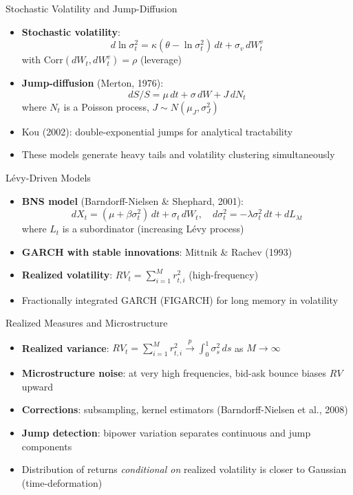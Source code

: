 \documentclass[9pt, aspectratio=169, t]{beamer}
\theoremstyle{definition}
\newcommand{\Corr}{\text{Corr}}
\begin{document}
\begin{frame}{Stochastic Volatility and Jump-Diffusion}
\begin{itemize}
\item \textbf{Stochastic volatility}:
\[
d\ln\sigma_t^2 = \kappa(\theta - \ln\sigma_t^2)\,dt + \sigma_v\,dW_t^v
\]
with $\Corr(dW_t, dW_t^v) = \rho$ (leverage)
\item \textbf{Jump-diffusion} (Merton, 1976):
\[
dS/S = \mu\,dt + \sigma\,dW + J\,dN_t
\]
where $N_t$ is a Poisson process, $J \sim N(\mu_J, \sigma_J^2)$
\item Kou (2002): double-exponential jumps for analytical tractability
\item These models generate heavy tails and volatility clustering simultaneously
\end{itemize}
\end{frame}

\begin{frame}{L\'{e}vy-Driven Models}
\begin{itemize}
\item \textbf{BNS model} (Barndorff-Nielsen \& Shephard, 2001):
\[
dX_t = (\mu + \beta\sigma_t^2)\,dt + \sigma_t\,dW_t, \quad d\sigma_t^2 = -\lambda\sigma_t^2\,dt + dL_{\lambda t}
\]
where $L_t$ is a subordinator (increasing L\'{e}vy process)
\item \textbf{GARCH with stable innovations}: Mittnik \& Rachev (1993)
\item \textbf{Realized volatility}: $RV_t = \sum_{i=1}^{M} r_{t,i}^2$ (high-frequency)
\item Fractionally integrated GARCH (FIGARCH) for long memory in volatility
\end{itemize}
\end{frame}

\begin{frame}{Realized Measures and Microstructure}
\begin{itemize}
\item \textbf{Realized variance}: $RV_t = \sum_{i=1}^M r_{t,i}^2 \xrightarrow{p} \int_0^1 \sigma_s^2\,ds$ as $M \to \infty$
\item \textbf{Microstructure noise}: at very high frequencies, bid-ask bounce biases $RV$ upward
\item \textbf{Corrections}: subsampling, kernel estimators (Barndorff-Nielsen et al., 2008)
\item \textbf{Jump detection}: bipower variation separates continuous and jump components
\item Distribution of returns \textit{conditional on} realized volatility is closer to Gaussian (time-deformation)
\end{itemize}
\end{frame}
\end{document}

